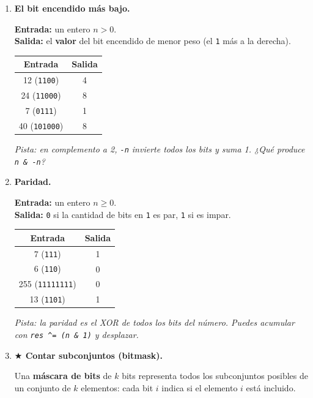 \documentclass[12pt, oneside]{article}
\begin{document}
\begin{enumerate}[resume]
  \item \textbf{El bit encendido más bajo.}

        \textbf{Entrada:} un entero $n > 0$. \\
        \textbf{Salida:} el \textbf{valor} del bit encendido de menor peso
        (el \texttt{1} más a la derecha).

        \begin{center}
        \begin{tabular}{cc}
          \textbf{Entrada} & \textbf{Salida} \\ \hline
          12 (\texttt{1100}) & 4 \\
          24 (\texttt{11000}) & 8 \\
          7  (\texttt{0111}) & 1 \\
          40 (\texttt{101000}) & 8
        \end{tabular}
        \end{center}

        \textit{Pista: en complemento a 2, \texttt{-n} invierte todos los bits y
        suma 1. ¿Qué produce \texttt{n \& -n}?}

  \item \textbf{Paridad.}

        \textbf{Entrada:} un entero $n \geq 0$. \\
        \textbf{Salida:} \texttt{0} si la cantidad de bits en \texttt{1}
        es par, \texttt{1} si es impar.

        \begin{center}
        \begin{tabular}{cc}
          \textbf{Entrada} & \textbf{Salida} \\ \hline
          7 (\texttt{111}) & 1 \\
          6 (\texttt{110}) & 0 \\
          255 (\texttt{11111111}) & 0 \\
          13 (\texttt{1101}) & 1
        \end{tabular}
        \end{center}

        \textit{Pista: la paridad es el XOR de todos los bits del número.
        Puedes acumular con \texttt{res \textasciicircum{}= (n \& 1)}
        y desplazar.}

  \item \textbf{$\bigstar$ Contar subconjuntos (bitmask).}

        Una \textbf{máscara de bits} de $k$ bits representa todos los
        subconjuntos posibles de un conjunto de $k$ elementos: cada bit
        $i$ indica si el elemento $i$ está incluido.


\end{enumerate}
\end{document}
